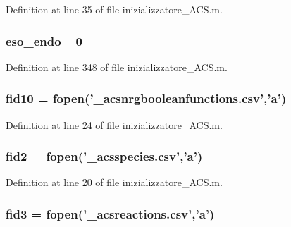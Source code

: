 Definition at line 35 of file inizializzatore\+\_\+\+A\+C\+S.\+m.

\hypertarget{a00110_aad3b1a68f41f4a6fa247c1cf8e1d450a}{
\subsubsection[{eso\+\_\+endo}]{ eso\+\_\+endo =0}}\label{a00110_aad3b1a68f41f4a6fa247c1cf8e1d450a}


Definition at line 348 of file inizializzatore\+\_\+\+A\+C\+S.\+m.

\hypertarget{a00110_aadad4fd2d661ea2b9f0c3a95e3f7b4ba}{
\subsubsection[{fid10}]{\setlength{\rightskip}{0pt plus 5cm}fid10 = fopen('\+\_\+acsnrgbooleanfunctions.\+csv','{\bf a}')}}\label{a00110_aadad4fd2d661ea2b9f0c3a95e3f7b4ba}


Definition at line 24 of file inizializzatore\+\_\+\+A\+C\+S.\+m.

\hypertarget{a00110_a11af2c31c7926441f43875d99b4577d2}{
\subsubsection[{fid2}]{\setlength{\rightskip}{0pt plus 5cm}fid2 = fopen('\+\_\+acsspecies.\+csv','{\bf a}')}}\label{a00110_a11af2c31c7926441f43875d99b4577d2}


Definition at line 20 of file inizializzatore\+\_\+\+A\+C\+S.\+m.

\hypertarget{a00110_a153e3250d4161f9bea4c140498016d94}{
\subsubsection[{fid3}]{\setlength{\rightskip}{0pt plus 5cm}fid3 = fopen('\+\_\+acsreactions.\+csv','{\bf a}')}}\label{a00110_a153e3250d4161f9bea4c140498016d94}


